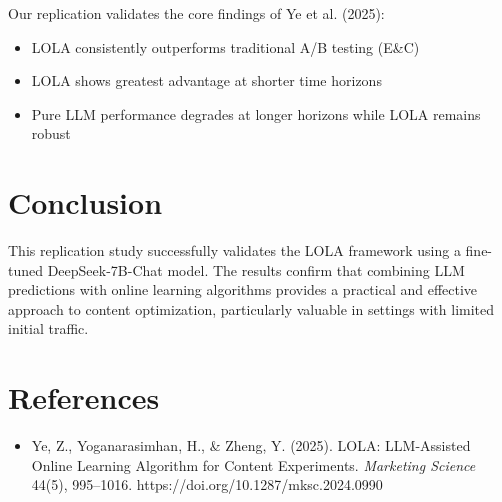 \documentclass[11pt,a4paper]{article}
\begin{document}
Our replication validates the core findings of Ye et al. (2025):

\begin{itemize}
    \item LOLA consistently outperforms traditional A/B testing (E\&C)
    \item LOLA shows greatest advantage at shorter time horizons
    \item Pure LLM performance degrades at longer horizons while LOLA remains robust
\end{itemize}

\section{Conclusion}

This replication study successfully validates the LOLA framework using a fine-tuned DeepSeek-7B-Chat model. The results confirm that combining LLM predictions with online learning algorithms provides a practical and effective approach to content optimization, particularly valuable in settings with limited initial traffic.

\section*{References}

\begin{itemize}
    \item Ye, Z., Yoganarasimhan, H., \& Zheng, Y. (2025). LOLA: LLM-Assisted Online Learning Algorithm for Content Experiments. \textit{Marketing Science}  
    \\44(5), 995–1016. https://doi.org/10.1287/mksc.2024.0990
\end{itemize}
\end{document}
